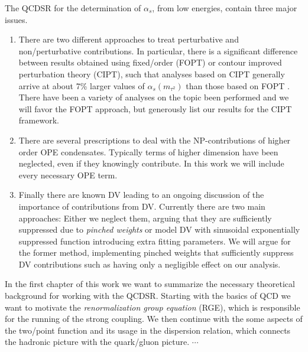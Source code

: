 \documentclass[../../index.tex]{subfiles}
\begin{document}
The QCDSR for the determination of $\alpha_s$, from low energies, contain three major issues.
\begin{enumerate}
  \item There are two different approaches to treat perturbative and non\-/perturbative
contributions. In particular, there is a significant difference between results
obtained using fixed\-/order (FOPT) or contour improved perturbation theory
(CIPT), such that analyses based on CIPT generally arrive at about 7\% larger
values of $\alpha_s(m_{\tau^2})$ than those based on FOPT \cite{PDG2018}.
There have been a variety of analyses on the topic been performed
\cite{Pich2013,Caprini2009,Jamin2005} and we will favor the FOPT approach,
but generously list our results for the CIPT framework.

  \item There are several prescriptions to deal with the NP-contributions of
    higher order OPE condensates. Typically terms of higher dimension have been
    neglected, even if they knowingly contribute. In this work we will include
    every necessary OPE term.

  \item Finally there are known DV leading to an ongoing discussion of the
importance of contributions from DV. Currently there are two main approaches:
Either we neglect them, arguing that they are sufficiently suppressed due to
\textit{pinched weights} \cite{Pich2016} or model DV with sinusoidal
exponentially suppressed function \cite{Cata2008,Boito2011a,Boito2014} introducing
extra fitting parameters. We will argue for the former method, implementing
pinched weights that sufficiently suppress DV contributions such as having only a negligible effect on our analysis.
\end{enumerate}

In the first chapter of this work we want to summarize the necessary theoretical
background for working with the QCDSR. Starting with the basics of QCD we want to motivate the
\textit{renormalization group equation} (RGE), which is responsible for the
running of the strong coupling. We then continue with the some
aspects of the two\-/point function and its usage in the dispersion relation,
which connects the hadronic picture with the quark\-/gluon picture. $\cdots$
\end{document}

